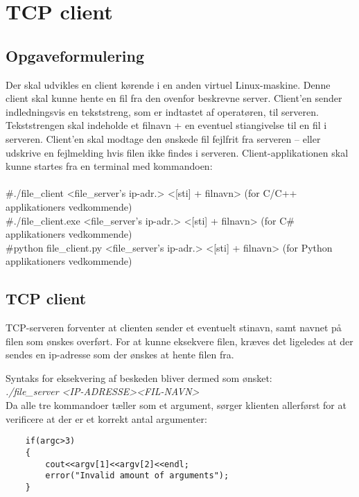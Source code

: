 \chapter{TCP client}

\section{Opgaveformulering}

Der skal udvikles en client kørende i en anden virtuel Linux-maskine. Denne client
skal kunne hente en fil fra den ovenfor beskrevne server. Client’en sender
indledningsvis en tekststreng, som er indtastet af operatøren, til serveren.
Tekststrengen skal indeholde et filnavn + en eventuel stiangivelse til en fil i serveren.
Client’en skal modtage den ønskede fil fejlfrit fra serveren – eller udskrive en
fejlmelding hvis filen ikke findes i serveren. Client-applikationen skal kunne startes fra
en terminal med kommandoen:\\ \\
\#./file\_client <file\_server’s ip-adr.> <[sti] + filnavn> (for C/C++ applikationers
vedkommende)\\
\#./file\_client.exe <file\_server’s ip-adr.> <[sti] + filnavn> (for C\# applikationers
vedkommende)\\ 
\#python file\_client.py <file\_server’s ip-adr.> <[sti] + filnavn> (for Python applikationers
vedkommende)\\

\section{TCP client}

TCP-serveren forventer at clienten sender et eventuelt stinavn, samt navnet på filen som ønskes overført. 
For at kunne eksekvere filen, kræves det ligeledes at der sendes en ip-adresse som der ønskes at hente filen fra. 

Syntaks for eksekvering af beskeden bliver dermed som ønsket:\\
\textit{./file\_server <IP-ADRESSE><FIL-NAVN>} \\

Da alle tre kommandoer tæller som et argument, sørger klienten allerførst for at verificere at der er et korrekt antal argumenter:

\begin{lstlisting}
	if(argc>3)
	{
		cout<<argv[1]<<argv[2]<<endl;
		error("Invalid amount of arguments");
	}
\end{lstlisting}


